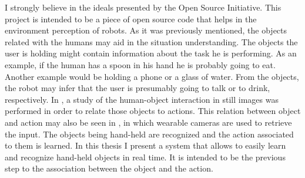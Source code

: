 


I strongly believe in the ideals presented by the Open Source Initiative. 
This project is intended to be a piece of open source code that helps in the environment perception of robots. 
As it was previously mentioned, the objects related with the humans may aid in the situation understanding. 
The objects the user is holding might contain information about the task he is performing. 
As an example, if the human has a spoon in his hand he is probably going to eat. 
Another example would be holding a phone or a glass of water. 
From the objects, the robot may infer that the user is presumably going to talk or to drink, respectively. 
	In \cite{Delaitre}, a study of the human-object interaction in still images was performed in order to relate those objects to actions. 
	This relation between object and action may also be seen in \cite{Fathi}, in which wearable cameras are used to retrieve the input. 
	The objects being hand-held are recognized and the action associated to them is learned. 
	In this thesis I present a system that allows to easily learn and recognize hand-held objects in real time. 
	It is intended to be the previous step to the association between the object and the action. 



